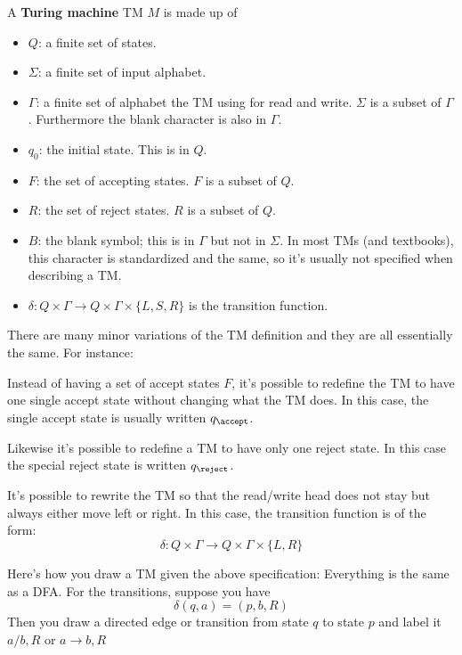 \begin{defn}
A {\bf Turing machine} TM $M$ is made up of
\begin{itemize}
 \item $Q$: a finite set of states.
 \item $\Sigma$: a finite set of input alphabet.
 \item $\Gamma$: a finite set of alphabet the TM using for read and write.
 $\Sigma$ is a subset of $\Gamma$.
 Furthermore the blank character is also in $\Gamma$.
 \item $q_0$: the initial state. This is in $Q$.
 \item $F$: the set of accepting states. $F$ is a subset of $Q$.
 \item $R$: the set of reject states. $R$ is a subset of $Q$.
 \item $B$: the blank symbol; this is in $\Gamma$ but not in $\Sigma$.
 In most TMs (and textbooks), this character is standardized and the same, 
 so it's usually not specified when describing a TM.
 \item $\delta : Q \times \Gamma \rightarrow Q 
\times \Gamma \times \{L, S, R\}$ is the transition function.
\end{itemize}
\end{defn}

There are many minor variations of the TM definition and they are
all essentially the same.
For instance:
\begin{tightlist}
\item Instead of having a set of accept states $F$, it's possible to redefine
the TM to have one single accept state without changing what the TM does.
In this case, the single accept state is usually written $q_\accept$.
\item Likewise it's possible to redefine a TM to have only one reject state.
In this case the special reject state is written $q_\reject$.
\item It's possible to rewrite the TM so that the read/write head does not
stay but always either move left or right.
In this case, the transition function is of the form:
\[
\delta : Q \times \Gamma \rightarrow Q 
\times \Gamma \times \{L, R\}
\]
\end{tightlist}

Here's how you draw a TM given the above specification: Everything
is the same as a DFA. For the transitions, suppose you have
\[
 \delta(q, a) = (p, b, R)
\]
Then you draw a directed edge or transition from state $q$ to
state $p$ and label it $a/b, R$ or $a \rightarrow b, R$

